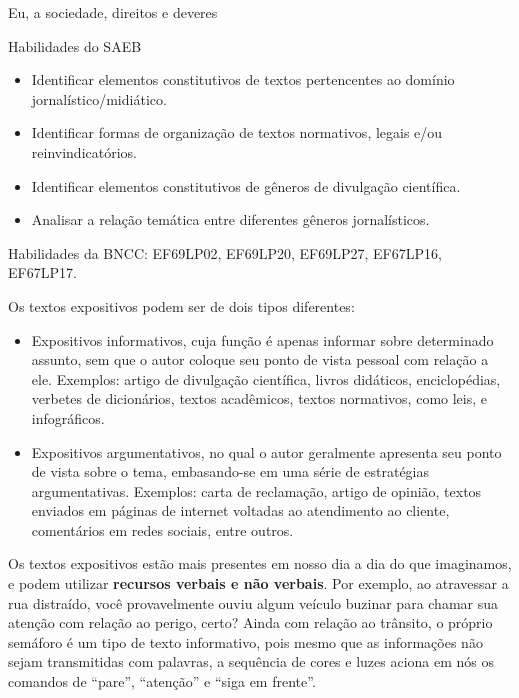 {Eu, a sociedade, direitos e deveres

Habilidades do SAEB

\begin{itemize}
\tightlist
\item
  Identificar elementos constitutivos de textos pertencentes ao domínio
  jornalístico/midiático.
\item
  Identificar formas de organização de textos normativos, legais e/ou
  reinvindicatórios.
\item
  Identificar elementos constitutivos de gêneros de divulgação
  científica.
\item
  Analisar a relação temática entre diferentes gêneros jornalísticos.
\end{itemize}

Habilidades da BNCC: EF69LP02, EF69LP20, EF69LP27, EF67LP16, EF67LP17.


Os textos expositivos podem ser de dois tipos diferentes:

\begin{itemize}
\item
  Expositivos informativos, cuja função é apenas informar sobre
  determinado assunto, sem que o autor coloque seu ponto de vista
  pessoal com relação a ele. Exemplos: artigo de divulgação científica,
  livros didáticos, enciclopédias, verbetes de dicionários, textos
  acadêmicos, textos normativos, como leis, e infográficos.
\item
  Expositivos argumentativos, no qual o autor geralmente apresenta seu
  ponto de vista sobre o tema, embasando-se em uma série de estratégias
  argumentativas. Exemplos: carta de reclamação, artigo de opinião,
  textos enviados em páginas de internet voltadas ao atendimento ao
  cliente, comentários em redes sociais, entre outros.
\end{itemize}

Os textos expositivos estão mais presentes em nosso dia a dia do que
imaginamos, e podem utilizar \textbf{recursos verbais e não verbais}.
Por exemplo, ao atravessar a rua distraído, você provavelmente ouviu
algum veículo buzinar para chamar sua atenção com relação ao perigo,
certo? Ainda com relação ao trânsito, o próprio semáforo é um tipo de
texto informativo, pois mesmo que as informações não sejam transmitidas
com palavras, a sequência de cores e luzes aciona em nós os comandos de
``pare'', ``atenção'' e ``siga em frente''.

}
